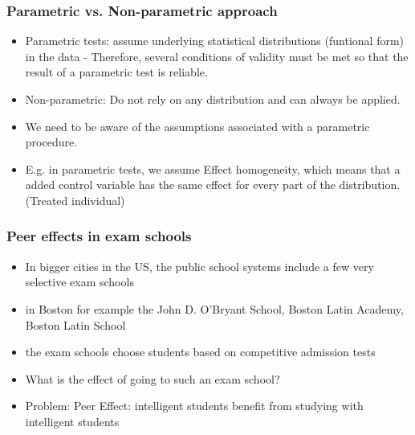 \documentclass{beamer}
\begin{document}
\begin{frame}
\frametitle{Parametric vs. Non-parametric approach}
\begin{itemize}
	\item Parametric tests: assume underlying statistical distributions (funtional form) in the data - Therefore, several conditions of validity must be met so that the result of a parametric test is reliable.
	\item Non-parametric: Do not rely on any distribution and can always be applied.
	\item We need to be aware of the assumptions associated with a parametric procedure.
	\item E.g. in parametric tests, we assume Effect homogeneity, which means that a added control variable has the same effect for every part of the distribution. (Treated individual)
	
\end{itemize}
\end{frame}

\begin{frame}
\frametitle{Peer effects in exam schools}
\begin{itemize}
\item In bigger cities in the US, the public school systems include a few very selective exam schools
\item in Boston for example the John D. O’Bryant School, Boston Latin Academy, Boston Latin School
\item the exam schools choose students based on competitive admission tests
\item What is the effect of going to such an exam school?
\item Problem: Peer Effect: intelligent students benefit from studying with intelligent students
\end{itemize}
\end{frame}
\end{document}
